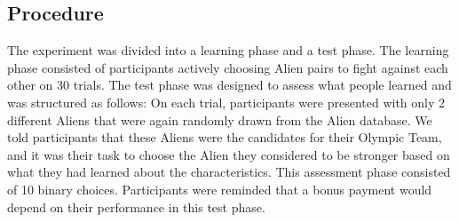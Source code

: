 \documentclass[10pt,letterpaper]{article}
\begin{document}
\subsection{Procedure}
The experiment was divided into a learning phase and a test phase. The learning phase consisted of participants actively choosing Alien pairs to fight against each other on 30 trials. The test phase was designed to assess what people learned and was structured as follows: On each trial, participants were presented with only 2 different Aliens that were again randomly drawn from the Alien database. We told participants that these Aliens were the candidates for their Olympic Team, and it was their task to choose the Alien they considered to be stronger based on what they had learned about the characteristics. This assessment phase consisted of 10 binary choices. Participants were reminded that a bonus payment would depend on their performance in this test phase.
\end{document}
